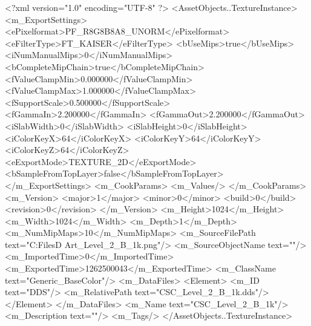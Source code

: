 <?xml version="1.0" encoding="UTF-8" ?>
<AssetObjects..TextureInstance>
	<m_ExportSettings>
		<ePixelformat>PF_R8G8B8A8_UNORM</ePixelformat>
		<eFilterType>FT_KAISER</eFilterType>
		<bUseMips>true</bUseMips>
		<iNumManualMips>0</iNumManualMips>
		<bCompleteMipChain>true</bCompleteMipChain>
		<fValueClampMin>0.000000</fValueClampMin>
		<fValueClampMax>1.000000</fValueClampMax>
		<fSupportScale>0.500000</fSupportScale>
		<fGammaIn>2.200000</fGammaIn>
		<fGammaOut>2.200000</fGammaOut>
		<iSlabWidth>0</iSlabWidth>
		<iSlabHeight>0</iSlabHeight>
		<iColorKeyX>64</iColorKeyX>
		<iColorKeyY>64</iColorKeyY>
		<iColorKeyZ>64</iColorKeyZ>
		<eExportMode>TEXTURE_2D</eExportMode>
		<bSampleFromTopLayer>false</bSampleFromTopLayer>
	</m_ExportSettings>
	<m_CookParams>
		<m_Values/>
	</m_CookParams>
	<m_Version>
		<major>1</major>
		<minor>0</minor>
		<build>0</build>
		<revision>0</revision>
	</m_Version>
	<m_Height>1024</m_Height>
	<m_Width>1024</m_Width>
	<m_Depth>1</m_Depth>
	<m_NumMipMaps>10</m_NumMipMaps>
	<m_SourceFilePath text="C:\Users\Shadow\Desktop\Working Files\3D Art\CSC_Level_2_B_1k.png"/>
	<m_SourceObjectName text=""/>
	<m_ImportedTime>0</m_ImportedTime>
	<m_ExportedTime>1262500043</m_ExportedTime>
	<m_ClassName text="Generic_BaseColor"/>
	<m_DataFiles>
		<Element>
			<m_ID text="DDS"/>
			<m_RelativePath text="CSC_Level_2_B_1k.dds"/>
		</Element>
	</m_DataFiles>
	<m_Name text="CSC_Level_2_B_1k"/>
	<m_Description text=""/>
	<m_Tags/>
</AssetObjects..TextureInstance>

